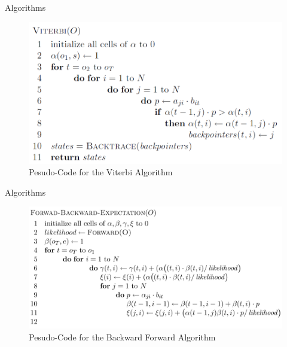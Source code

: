 \documentclass[11pt]{beamer}
\begin{document}
\begin{frame}{Algorithms}
\begin{figure}[H]

\centering
\includegraphics[scale=0.4]{"vit"}
\caption{Pesudo-Code for the Viterbi Algorithm \cite{cuhmm}}
\end{figure}
\end{frame}

\begin{frame}{Algorithms}
\begin{figure}[H]

\centering
\includegraphics[scale=0.3]{"BW"}
\caption{Pesudo-Code for the Backward Forward Algorithm \cite{cuhmm}}
\end{figure}
\end{frame}
\end{document}
